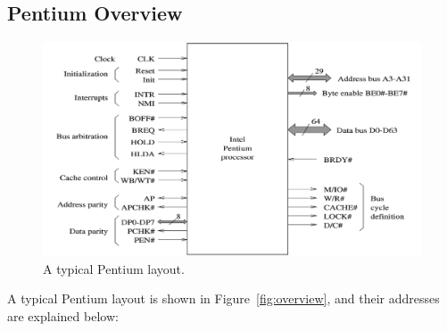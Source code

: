 \documentclass[doc,natbib,12pt]{apa6}
\begin{document}
	\subsection{Pentium Overview}
	\begin{figure}[htpb]
		\centering
		\includegraphics[width=1\textwidth]{overview.png}
		\caption{\label{fig:overview}A typical Pentium layout. \citep{Dandamudi2003}}
	\end{figure}
	A typical Pentium layout is shown in Figure~\vref{fig:overview}, and their addresses are explained below:
\end{document}
